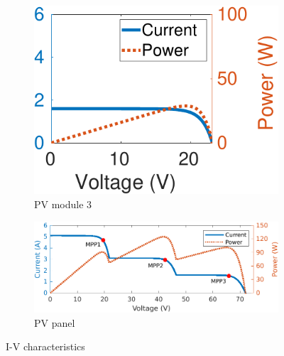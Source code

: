 \documentclass[conference]{pvsctran}
\begin{document}
\begin{figure}
\begin{subfigure}[b]{0.3\linewidth}
        \includegraphics[width=\linewidth]{PVSC-46/fig/m_3.png}
        \caption{PV module 3}
    \end{subfigure}
    \hfill
    \begin{subfigure}[b]{\linewidth}
        \centering
        \vspace{3mm}
        \includegraphics[width=\linewidth]{PVSC-46/fig/panel.png}
        \caption{PV panel}
    \end{subfigure}
    \caption{I-V characteristics}
    \label{fig:IV}
\end{figure}
\end{document}
